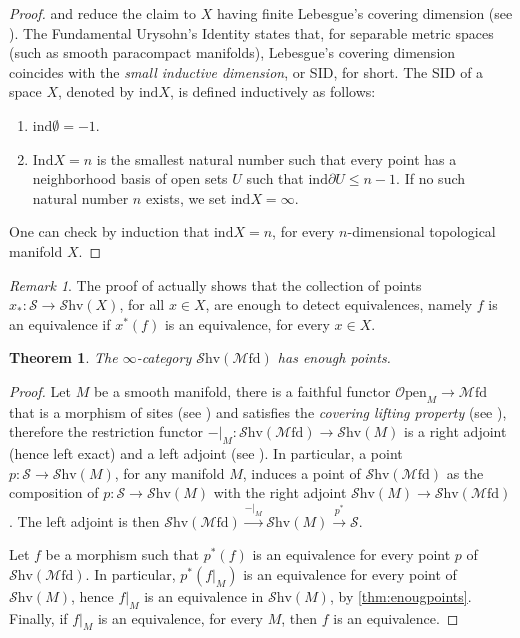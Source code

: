 \documentclass[10pt]{amsart}
\newcommand{\s}{\mathscr{S}}
\newcommand{\Mfd}{\mathscr{M}\mathrm{fd}}
\newcommand{\Shv}{\mathscr{S}\mathrm{hv}}
\newcommand{\Open}{\mathscr{O}\mathrm{pen}}
\newtheorem{theorem}[equation]{Theorem}
\theoremstyle{definition}
\theoremstyle{remark}
\newtheorem{remark}[equation]{Remark}
\numberwithin{equation}{section}
\begin{document}
\begin{proof}
	\cite[Corollary 7.2.1.17]{lurie2009htt} and \cite[Theorem 7.2.3.6]{lurie2009htt} reduce the claim to $X$ having finite Lebesgue's covering dimension (see \cite[Definition 7.2.3.1]{lurie2009htt}). The Fundamental Urysohn's Identity states that, for separable metric spaces (such as smooth paracompact manifolds), Lebesgue's covering dimension coincides with the \emph{small inductive dimension}, or SID, for short. The SID of a space $X$, denoted by $\mathrm{ind}X$, is defined inductively as follows: 
	\begin{enumerate}
		\item $\mathrm{ind}\emptyset=-1$.
		\item $\mathrm{Ind}X=n$ is the smallest natural number such that every point has a neighborhood basis of open sets $U$ such that $\mathrm{ind}\partial U\leq n-1$. If no such natural number $n$ exists, we set $\mathrm{ind}X=\infty$.
	\end{enumerate}One can check by induction that $\mathrm{ind} X=n$, for every $n$-dimensional topological manifold $X$.
\end{proof}
\begin{remark}\label{rmk:geopoints}
	The proof of \cite[Corollary 7.2.1.17]{lurie2009htt} actually shows that the collection of points $x_*:\s\to\Shv(X)$, for all $x\in X$, are enough to detect equivalences, namely $f$ is an equivalence if $x^*(f)$ is an equivalence, for every $x\in X$. 
\end{remark}
\begin{theorem}\label{thm:mfdenoughpoints}
	The $\infty$-category $\Shv(\Mfd)$ has enough points. 
\end{theorem}
\begin{proof}
	Let $M$ be a smooth manifold, there is a faithful functor $\Open_M\to\Mfd$ that is a morphism of sites (see \cite[Definition A.10]{pstragowski2022syntheticspectracellularmotivic}) and satisfies the \emph{covering lifting property} (see \cite[Definition A.12]{pstragowski2022syntheticspectracellularmotivic}), therefore the restriction functor $-|_{M}:\Shv(\Mfd)\to\Shv(M)$ is a right adjoint (hence left exact) and a left adjoint (see \cite[Proposition A.13]{pstragowski2022syntheticspectracellularmotivic}). In particular, a point $p:\s\to\Shv(M)$, for any manifold $M$, induces a point of $\Shv(\Mfd)$ as the composition of $p:\s\to\Shv(M)$ with the right adjoint $\Shv(M)\to\Shv(\Mfd)$. The left adjoint is then $\Shv(\Mfd)\xrightarrow{-|_M}\Shv(M)\xrightarrow{p^*}\s$. 
	
	Let $f$ be a morphism such that $p^*(f)$ is an equivalence for every point $p$ of $\Shv(\Mfd)$. In particular, $p^*(f|_M)$ is an equivalence for every point of $\Shv(M)$, hence $f|_M$ is an equivalence in $\Shv(M)$, by \cref{thm:enougpoints}. Finally, if $f|_M$ is an equivalence, for every $M$, then $f$ is an equivalence. 
\end{proof}
\end{document}

